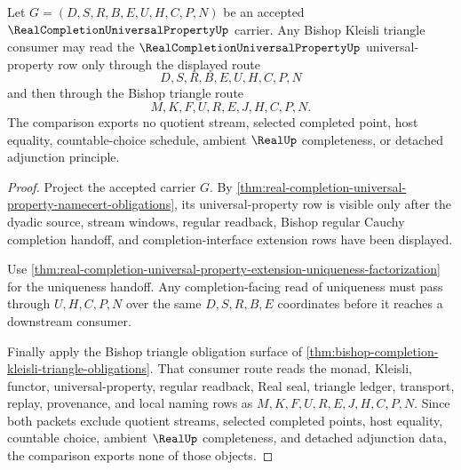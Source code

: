 \begin{theorem}
\label{thm:real-completion-universal-property-bishop-kleisli-comparison}
Let $G=(D,S,R,B,E,U,H,C,P,N)$ be an accepted $\RealCompletionUniversalPropertyUp$ carrier. Any Bishop Kleisli triangle consumer may read the $\RealCompletionUniversalPropertyUp$ universal-property row only through the displayed route
$$
D,S,R,B,E,U,H,C,P,N
$$
and then through the Bishop triangle route
$$
M,K,F,U,R,E,J,H,C,P,N .
$$
The comparison exports no quotient stream, selected completed point, host equality, countable-choice schedule, ambient $\RealUp$ completeness, or detached adjunction principle.
\end{theorem}
\begin{proof}
Project the accepted carrier $G$. By \autoref{thm:real-completion-universal-property-namecert-obligations}, its universal-property row is visible only after the dyadic source, stream windows, regular readback, Bishop regular Cauchy completion handoff, and completion-interface extension rows have been displayed.

Use \autoref{thm:real-completion-universal-property-extension-uniqueness-factorization} for the uniqueness handoff. Any completion-facing read of uniqueness must pass through $U,H,C,P,N$ over the same $D,S,R,B,E$ coordinates before it reaches a downstream consumer.

Finally apply the Bishop triangle obligation surface of \autoref{thm:bishop-completion-kleisli-triangle-obligations}. That consumer route reads the monad, Kleisli, functor, universal-property, regular readback, Real seal, triangle ledger, transport, replay, provenance, and local naming rows as $M,K,F,U,R,E,J,H,C,P,N$. Since both packets exclude quotient streams, selected completed points, host equality, countable choice, ambient $\RealUp$ completeness, and detached adjunction data, the comparison exports none of those objects.
\end{proof}

